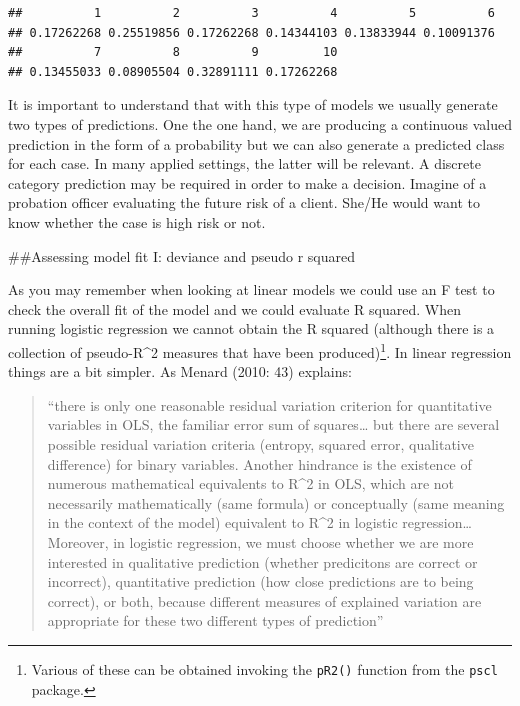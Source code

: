 \documentclass[]{book}
\newenvironment{Shaded}{\begin{snugshade}}{\end{snugshade}}
\newcommand{\CommentTok}[1]{\textcolor[rgb]{0.56,0.35,0.01}{\textit{#1}}}
\newcommand{\DataTypeTok}[1]{\textcolor[rgb]{0.13,0.29,0.53}{#1}}
\newcommand{\DecValTok}[1]{\textcolor[rgb]{0.00,0.00,0.81}{#1}}
\newcommand{\KeywordTok}[1]{\textcolor[rgb]{0.13,0.29,0.53}{\textbf{#1}}}
\newcommand{\NormalTok}[1]{#1}
\newcommand{\OperatorTok}[1]{\textcolor[rgb]{0.81,0.36,0.00}{\textbf{#1}}}
\newcommand{\StringTok}[1]{\textcolor[rgb]{0.31,0.60,0.02}{#1}}
\let\rmarkdownfootnote\footnote%
\def\footnote{\protect\rmarkdownfootnote}
\theoremstyle{definition}
\theoremstyle{definition}
\theoremstyle{definition}
\theoremstyle{remark}
\begin{document}
\begin{Shaded}
\end{Shaded}

\begin{verbatim}
##          1          2          3          4          5          6 
## 0.17262268 0.25519856 0.17262268 0.14344103 0.13833944 0.10091376 
##          7          8          9         10 
## 0.13455033 0.08905504 0.32891111 0.17262268
\end{verbatim}

It is important to understand that with this type of models we usually
generate two types of predictions. One the one hand, we are producing a
continuous valued prediction in the form of a probability but we can
also generate a predicted class for each case. In many applied settings,
the latter will be relevant. A discrete category prediction may be
required in order to make a decision. Imagine of a probation officer
evaluating the future risk of a client. She/He would want to know
whether the case is high risk or not.

\#\#Assessing model fit I: deviance and pseudo r squared

As you may remember when looking at linear models we could use an F test
to check the overall fit of the model and we could evaluate R squared.
When running logistic regression we cannot obtain the R squared
(although there is a collection of pseudo-R\^{}2 measures that have been
produced)\footnote{Various of these can be obtained invoking the
  \texttt{pR2()} function from the \texttt{pscl} package.}. In linear
regression things are a bit simpler. As Menard (2010: 43) explains:

\begin{quote}
``there is only one reasonable residual variation criterion for
quantitative variables in OLS, the familiar error sum of squares\ldots{}
but there are several possible residual variation criteria (entropy,
squared error, qualitative difference) for binary variables. Another
hindrance is the existence of numerous mathematical equivalents to
R\^{}2 in OLS, which are not necessarily mathematically (same formula)
or conceptually (same meaning in the context of the model) equivalent to
R\^{}2 in logistic regression\ldots{} Moreover, in logistic regression,
we must choose whether we are more interested in qualitative prediction
(whether predicitons are correct or incorrect), quantitative prediction
(how close predictions are to being correct), or both, because different
measures of explained variation are appropriate for these two different
types of prediction''
\end{quote}
\end{document}
